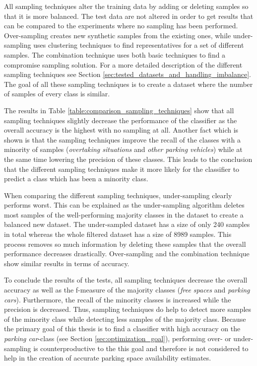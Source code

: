 All sampling techniques alter the training data by adding or deleting samples so that it is more balanced. The test data are not altered in order to get results that can be compared to the experiments where no sampling has been performed.
Over-sampling creates new synthetic samples from the existing ones, while under-sampling uses clustering techniques to find representatives for a set of different samples. The combination technique uses both basic techniques to find a compromise sampling solution. For a more detailed description of the different sampling techniques see Section \ref{sec:tested_datasets_and_handling_imbalance}. The goal of all these sampling techniques is to create a dataset where the number of samples of every class is similar. 

The results in Table \ref{table:comparison_sampling_techniques} show that all sampling techniques slightly decrease the performance of the classifier as the overall accuracy is the highest with no sampling at all. Another fact which is shown is that the sampling techniques improve the recall of the classes with a minority of samples (\emph{overtaking situations} and \emph{other parking vehicles}) while at the same time lowering the precision of these classes. This leads to the conclusion that the different sampling techniques make it more likely for the classifier to predict a class which has been a minority class.

When comparing the different sampling techniques, under-sampling clearly performs worst. This can be explained as the under-sampling algorithm deletes most samples of the well-performing majority classes in the dataset to create a balanced new dataset. The under-sampled dataset has a size of only 240 samples in total whereas the whole filtered dataset has a size of 8989 samples. This process removes so much information by deleting these samples that the overall performance decreases drastically. Over-sampling and the combination technique show similar results in terms of accuracy.

To conclude the results of the tests, all sampling techniques decrease the overall accuracy as well as the f-measure of the majority classes (\emph{free spaces} and \emph{parking cars}). Furthermore, the recall of the minority classes is increased while the precision is decreased. Thus, sampling techniques do help to detect more samples of the minority class while detecting less samples of the majority class. Because the primary goal of this thesis is to find a classifier with high accuracy on the \emph{parking car}-class (see Section \ref{sec:optimization_goal}), performing over- or under-sampling is counterproductive to the this goal and therefore is not considered to help in the creation of accurate parking space availability estimates.




